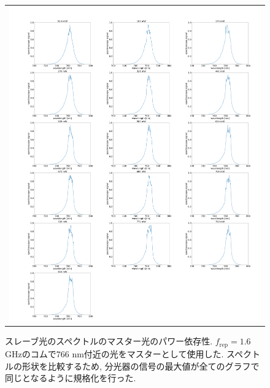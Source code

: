 \documentclass[uplatex, dvipdfmx, a4paper, report, papersize, 11pt]{jsbook}
\begin{document}
\newpage
\begin{figure}[H]
  \centering
    \begin{tabular}{c}
      \begin{minipage}{1\hsize}
        \centering
          \includegraphics[keepaspectratio,  scale=0.15,  angle=0]
                          {figures/chapter4/astro_TA_output_seed_dependency766.png}
                          \caption{スレーブ光のスペクトルのマスター光のパワー依存性. $f_\mathrm{rep} = 1.6$ GHzのコムで$766$ nm付近の光をマスターとして使用した. スペクトルの形状を比較するため, 分光器の信号の最大値が全てのグラフで同じとなるように規格化を行った. }
                          \label{astro_TA_output_seed_dependency766}
      \end{minipage}
  \end{tabular}
\end{figure}

\newpage
\end{document}
